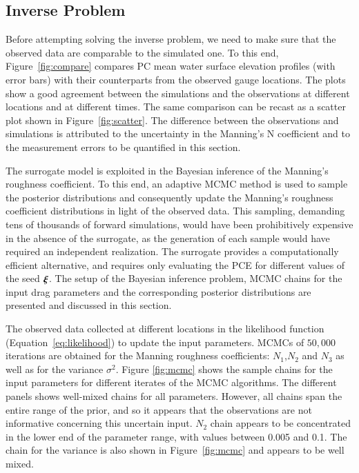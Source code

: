 \subsection{Inverse Problem} 
\label{sec:inverse}

Before attempting solving the inverse problem,
we need to make sure that the observed data are
comparable to the simulated one. To this end, Figure~\ref{fig:compare}
compares PC mean water surface elevation profiles (with error bars)
with their counterparts from the observed gauge locations.
The plots show a good agreement between the simulations and the 
observations at different locations and at different times. 
The same comparison can be recast as a scatter plot shown in 
Figure~\ref{fig:scatter}. The difference between the observations
and simulations is attributed to the uncertainty in the 
Manning's N coefficient and to the measurement errors to be quantified
in this section.

The surrogate model is exploited in the Bayesian inference of the Manning's 
roughness coefficient.  To this end, an adaptive MCMC method is used to sample 
the posterior distributions \citep{Gareth2009,Haario2001} and consequently 
update the Manning's roughness coefficient distributions in light of the 
observed data. This sampling, demanding tens of thousands of forward simulations, 
would have been prohibitively expensive in the
absence of the surrogate, as the generation of each sample would have required an
independent \geoclaw realization. The surrogate provides a computationally
efficient alternative, and requires only evaluating the PCE for different values 
of the seed $\xxi$. The setup of the Bayesian inference problem,
MCMC chains for the input drag parameters and the corresponding posterior distributions are 
presented and discussed in this section. 


The observed data collected at different locations 
in the likelihood function (Equation~\eqref{eq:likelihood}) to update the input parameters.
MCMCs of $50,000$ iterations are obtained for the Manning roughness coefficients: 
$N_1$,$N_2$ and $N_3$ as well as for the variance $\sigma^2$. Figure \ref{fig:mcmc} 
shows the sample chains for
the input parameters for different iterates of the MCMC algorithms. 
The different panels
shows well-mixed chains for all parameters.
However, all chains span the entire range
of the prior, and so it appears that the observations are not informative 
concerning this uncertain input.  $N_{2}$ chain appears to be concentrated in the lower end of the
parameter range, with values between 0.005 and 0.1.
The chain for the variance is also shown in 
Figure~\ref{fig:mcmc} and appears to be well mixed.





